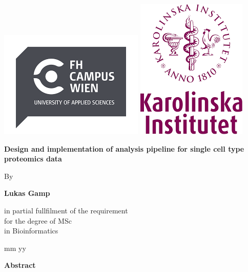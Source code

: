 \documentclass[
  11pt,
]{article}
\author{}
\date{\vspace{-2.5em}}
\begin{document}
\allsectionsfont{\centering}
\subsectionfont{\raggedright}
\subsubsectionfont{\raggedright}


\begin{centering}

\vspace{3cm}

\includegraphics[width=0.2\linewidth]{FHCW_logo} 
\includegraphics[width=0.2\linewidth]{KI_logo} 

\vspace{1cm}

\Large
\doublespacing
{\bf Design and implementation of analysis pipeline for single cell type proteomics data} 

\vspace{1 cm}

\normalsize
\singlespacing
By

\vspace{0.5 cm}

\Large

{\bf Lukas Gamp}

\vspace{1.5 cm}

in partial fullfilment of the requirement \\for the degree of MSc \\in Bioinformatics

\vspace{1.5 cm}

\normalsize
mm yy
\end{centering}

\newpage


\begin{centering}

{\bf Abstract}

\end{centering}
\end{document}
